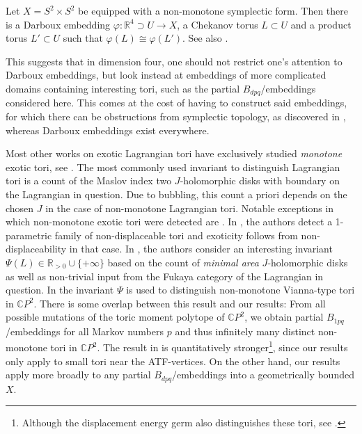 \documentclass[AIF,Unicode,manuscript]{cedram}
\begin{document}
\begin{remark}
    Let $X = S^2 \times S^2$ be equipped with a non-monotone symplectic form.
Then there is a Darboux embedding $\varphi \colon \mathbb{R}^4 \supset U \rightarrow X$, a Chekanov torus $L \subset U$ and a product torus $L' \subset U$ such that $\varphi(L) \cong \varphi(L')$.
See also \cite[Example 5.6]{brendel2023local}.
\end{remark}

This suggests that in dimension four, one should not restrict one's attention to Darboux embeddings, but look instead at embeddings of more complicated domains containing interesting tori, such as the partial $B_{dpq}$\-/embeddings considered here.
This comes at the cost of having to construct said embeddings, for which there can be obstructions from symplectic topology, as discovered in \cite{EvaSmi18}, whereas Darboux embeddings exist everywhere. 

Most other works on exotic Lagrangian tori have exclusively studied \emph{monotone} exotic tori, see \cite{Aur15, Che96, CheSch10, EliPol97, GalMik22, Via17, Via16}.
The most commonly used invariant to distinguish Lagrangian tori is a count of the Maslov index two $J$-holomorphic disks with boundary on the Lagrangian in question.
Due to bubbling, this count a priori depends on the chosen $J$ in the case of non-monotone Lagrangian tori.
Notable exceptions in which non-monotone exotic tori were detected are \cite{FOOO12, SheTonVia19}.
In \cite{FOOO12}, the authors detect a 1-parametric family of non-displaceable tori and exoticity follows from non-displaceability in that case.
In \cite{SheTonVia19}, the authors consider an interesting invariant $\Psi(L) \in \mathbb{R}_{>0} \cup \{+\infty\}$ based on the count of \emph{minimal area} $J$-holomorphic disks as well as non-trivial input from the Fukaya category of the Lagrangian in question.
In \cite[Section 7]{SheTonVia19} the invariant $\Psi$ is used to distinguish non-monotone Vianna-type tori in $\mathbb{C}P^2$.
There is some overlap between this result and our results:
From all possible mutations of the toric moment polytope of $\mathbb{C}P^2$, we obtain partial $B_{1pq}$\-/embeddings for all Markov numbers $p$ and thus infinitely many distinct non-monotone tori in $\mathbb{C}P^2$.
The result in \cite[Section 7]{SheTonVia19} is quantitatively stronger\footnote{Although the displacement energy germ also distinguishes these tori, see \cite[Example 3.7]{brendel2023local}.}, since our results only apply to small tori near the ATF-vertices.
On the other hand, our results apply more broadly to any partial $B_{dpq}$\-/embeddings into a geometrically bounded $X$.
\end{document}
